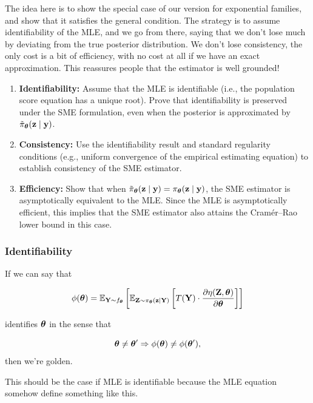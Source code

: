 \documentclass[twoside,11pt]{article}
\begin{document}
\begin{tcolorbox}[colback=yellow!5!white,colframe=yellow!60!black,title=Main Objective: Deep Dive with Exponential Families]
The idea here is to show the special case of our version for exponential families, and show that it satisfies the general condition. The strategy is to assume identifiability of the MLE, and we go from there, saying that we don't lose much by deviating from the true posterior distribution. We don't lose consistency, the only cost is a bit of efficiency, with no cost at all if we have an exact approximation. This reassures people that the estimator is well grounded!
\begin{enumerate}
    \item \textbf{Identifiability:} Assume that the MLE is identifiable (i.e., the population score equation has a unique root). Prove that identifiability is preserved under the SME formulation, even when the posterior is approximated by \( \tilde\pi_{\bm{\theta}}({\bf z} \mid {\bf y}) \).
    
    \item \textbf{Consistency:} Use the identifiability result and standard regularity conditions (e.g., uniform convergence of the empirical estimating equation) to establish consistency of the SME estimator.
    
    \item \textbf{Efficiency:} Show that when \( \tilde\pi_{\bm{\theta}}({\bf z} \mid {\bf y}) = \pi_{\bm{\theta}}({\bf z} \mid {\bf y}) \), the SME estimator is asymptotically equivalent to the MLE. Since the MLE is asymptotically efficient, this implies that the SME estimator also attains the Cramér–Rao lower bound in this case.
\end{enumerate}
\end{tcolorbox}

\subsubsection{Identifiability}
If we can say that 

$$
\phi({\bm{\theta}}) = \mathbb{E}_{{\bf Y} \sim f_{\bm{\theta}}}
\left[
\mathbb{E}_{{\bf Z}\sim\pi_{\bm{\theta}}({\bf z} \mid {\bf Y})} 
\left[ 
T({\bf Y}) \cdot 
\frac{\partial \eta({\bf Z}, {\bm{\theta}})}{\partial {\bm{\theta}}}
\right]
\right]
$$

identifies ${\bm{\theta}}$ in the sense that 

$$
{\bm{\theta}} \neq {\bm{\theta}}' \Rightarrow \phi({\bm{\theta}})\neq\phi({\bm{\theta}}'),
$$
then we're golden.

This should be the case if MLE is identifiable because the MLE equation somehow define something like this.
\end{document}

